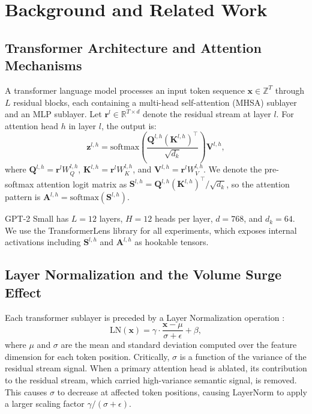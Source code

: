 \documentclass[12pt,a4paper]{article}
\begin{document}
\section{Background and Related Work}
\label{sec:background}

\subsection{Transformer Architecture and Attention Mechanisms}

A transformer language model \citep{vaswani2017attention} processes an input
token sequence $\mathbf{x} \in \mathbb{Z}^T$ through $L$ residual blocks, each
containing a multi-head self-attention (MHSA) sublayer and an MLP sublayer.
Let $\mathbf{r}^l \in \mathbb{R}^{T \times d}$ denote the residual stream at
layer $l$. For attention head $h$ in layer $l$, the output is:
\begin{equation}
  \mathbf{z}^{l,h} = \text{softmax}\!\left(\frac{\mathbf{Q}^{l,h}(\mathbf{K}^{l,h})^\top}{\sqrt{d_k}}\right)\mathbf{V}^{l,h},
  \label{eq:attn}
\end{equation}
where $\mathbf{Q}^{l,h} = \mathbf{r}^l W_Q^{l,h}$, $\mathbf{K}^{l,h} = \mathbf{r}^l W_K^{l,h}$,
and $\mathbf{V}^{l,h} = \mathbf{r}^l W_V^{l,h}$. We denote the
pre-softmax attention logit matrix as
$\mathbf{S}^{l,h} = \mathbf{Q}^{l,h}(\mathbf{K}^{l,h})^\top / \sqrt{d_k}$,
so the attention pattern is $\mathbf{A}^{l,h} = \text{softmax}(\mathbf{S}^{l,h})$.

GPT-2 Small \citep{radford2019language} has $L=12$ layers, $H=12$ heads per
layer, $d=768$, and $d_k=64$. We use the TransformerLens library
\citep{nanda2022transformerlens} for all experiments, which exposes internal
activations including $\mathbf{S}^{l,h}$ and $\mathbf{A}^{l,h}$ as hookable
tensors.

\subsection{Layer Normalization and the Volume Surge Effect}
\label{subsec:layernorm}

Each transformer sublayer is preceded by a Layer Normalization operation
\citep{ba2016layer}:
\begin{equation}
  \text{LN}(\mathbf{x}) = \gamma \cdot \frac{\mathbf{x} - \mu}{\sigma + \epsilon} + \beta,
\end{equation}
where $\mu$ and $\sigma$ are the mean and standard deviation computed over the
feature dimension for each token position. Critically, $\sigma$ is a function of
the variance of the residual stream signal. When a primary attention head is
ablated, its contribution to the residual stream, which carried high-variance
semantic signal, is removed. This causes $\sigma$ to decrease at affected token
positions, causing LayerNorm to apply a larger scaling factor $\gamma/(\sigma+\epsilon)$.
\end{document}

